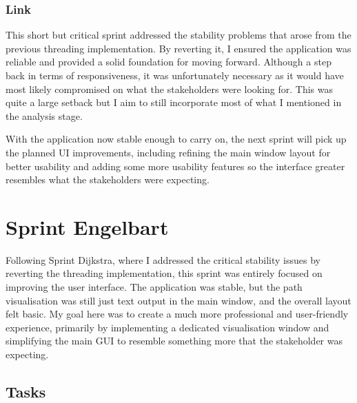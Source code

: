 \subsubsection{Link}
This short but critical sprint addressed the stability problems that arose from the previous threading implementation. By reverting it, I ensured the application was reliable and provided a solid foundation for moving forward. Although a step back in terms of responsiveness, it was unfortunately necessary as it would have most likely compromised on what the stakeholders were looking for. This was quite a large setback but I aim to still incorporate most of what I mentioned in the analysis stage.

With the application now stable enough to carry on, the next sprint will pick up the planned UI improvements, including refining the main window layout for better usability and adding some more usability features so the interface greater resembles what the stakeholders were expecting.

\newpage

\section{Sprint Engelbart}

Following Sprint Dijkstra, where I addressed the critical stability issues by reverting the threading implementation, this sprint was entirely focused on improving the user interface. The application was stable, but the path visualisation was still just text output in the main window, and the overall layout felt basic. My goal here was to create a much more professional and user-friendly experience, primarily by implementing a dedicated visualisation window and simplifying the main GUI to resemble something more that the stakeholder was expecting.

\subsection{Tasks}

